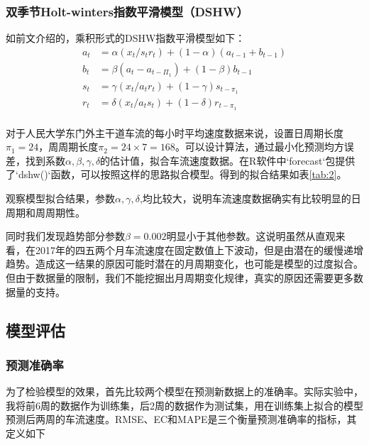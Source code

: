 \documentclass[lang=cn,11pt,a4paper]{elegantpaper}
\begin{document}
\subsubsection{双季节Holt-winters指数平滑模型（DSHW）}
如前文介绍的，乘积形式的DSHW指数平滑模型如下：
\begin{equation}
\begin{aligned}
a_t&=\alpha(x_t/s_tr_t)+(1-\alpha)(a_{t-1}+b_{t-1})\\
b_t&=\beta(a_t-a_{t-\Pi_1})+(1-\beta)b_{t-1}\\
s_t&=\gamma(x_t/a_tr_t)+(1-\gamma)s_{t-\pi_1}\\
r_t&=\delta(x_t/a_ts_t)+(1-\delta)r_{t-\pi_1}\\
\end{aligned}
\end{equation}

对于人民大学东门外主干道车流的每小时平均速度数据来说，设置日周期长度$\pi_1=24$，周周期长度$\pi_2=24\times7=168$。可以设计算法，通过最小化预测均方误差，找到系数$\alpha,\beta,\gamma,\delta$的估计值，拟合车流速度数据。在R软件中`forecast`包提供了`dshw()`函数，可以按照这样的思路拟合模型。得到的拟合结果如表\ref{tab:2}。

\begin{table}[!htbp]
\caption{DSHW模型参数拟合结果}
\centering
\label{tab:2}
\end{table}

观察模型拟合结果，参数$\alpha,\gamma,\delta$,均比较大，说明车流速度数据确实有比较明显的日周期和周周期性。

同时我们发现趋势部分参数$\beta=0.002$明显小于其他参数。这说明虽然从直观来看，在2017年的四五两个月车流速度在固定数值上下波动，但是由潜在的缓慢递增趋势。造成这一结果的原因可能时潜在的月周期变化，也可能是模型的过度拟合。但由于数据量的限制，我们不能挖掘出月周期变化规律，真实的原因还需要更多数据量的支持。

\subsection{模型评估}
\subsubsection{预测准确率}
为了检验模型的效果，首先比较两个模型在预测新数据上的准确率。实际实验中，我将前6周的数据作为训练集，后2周的数据作为测试集，用在训练集上拟合的模型预测后两周的车流速度。RMSE、EC和MAPE是三个衡量预测准确率的指标，其定义如下
\end{document}
